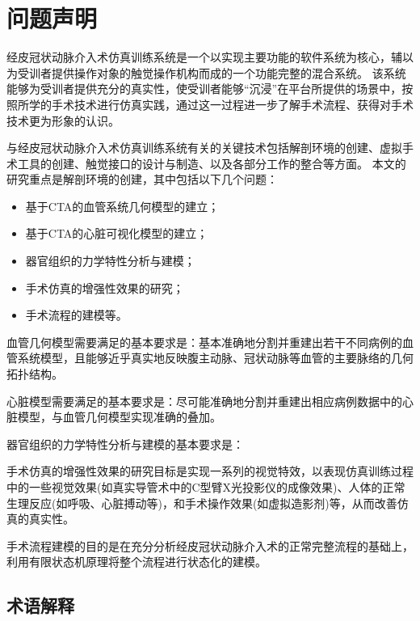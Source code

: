 \section{问题声明}
\label{sec1-1}


经皮冠状动脉介入术仿真训练系统是一个以实现主要功能的软件系统为核心，辅以为受训者提供操作对象的触觉操作机构而成的一个功能完整的混合系统。
该系统能够为受训者提供充分的真实性，使受训者能够“沉浸”在平台所提供的场景中，按照所学的手术技术进行仿真实践，通过这一过程进一步了解手术流程、获得对手术技术更为形象的认识。

与经皮冠状动脉介入术仿真训练系统有关的关键技术包括解剖环境的创建、虚拟手术工具的创建、触觉接口的设计与制造、以及各部分工作的整合等方面。
本文的研究重点是解剖环境的创建，其中包括以下几个问题：
\begin{itemize}
\item 基于CTA的血管系统几何模型的建立；
\item 基于CTA的心脏可视化模型的建立；
\item 器官组织的力学特性分析与建模；
\item 手术仿真的增强性效果的研究；
\item 手术流程的建模等。
\end{itemize}

血管几何模型需要满足的基本要求是：基本准确地分割并重建出若干不同病例的血管系统模型，且能够近乎真实地反映腹主动脉、冠状动脉等血管的主要脉络的几何拓扑结构。

心脏模型需要满足的基本要求是：尽可能准确地分割并重建出相应病例数据中的心脏模型，与血管几何模型实现准确的叠加。

器官组织的力学特性分析与建模的基本要求是：

手术仿真的增强性效果的研究目标是实现一系列的视觉特效，以表现仿真训练过程中的一些视觉效果(如真实导管术中的C型臂X光投影仪的成像效果)、人体的正常生理反应(如呼吸、心脏搏动等)，和手术操作效果(如虚拟造影剂)等，从而改善仿真的真实性。%

手术流程建模的目的是在充分分析经皮冠状动脉介入术的正常完整流程的基础上，利用有限状态机原理将整个流程进行状态化的建模。

\subsection{术语解释}
\label{sec1-1-2}

